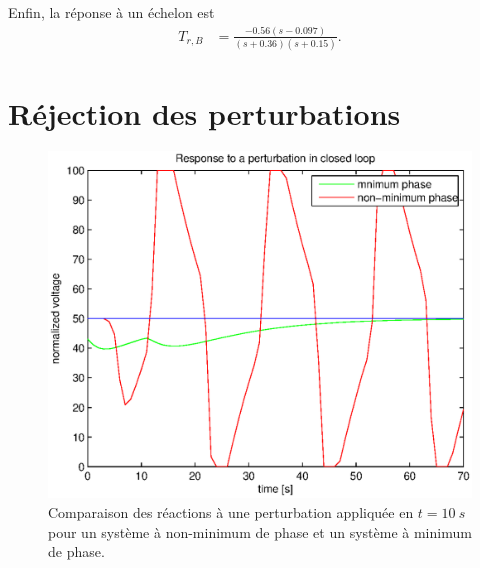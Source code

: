 \documentclass[frenchb, paper=a4, fontsize=11pt]{scrartcl}
\numberwithin{equation}{section}					%
\numberwithin{figure}{section}					%
\numberwithin{table}{section}						%
\begin{document}
Enfin, la réponse à un échelon est
\begin{align*}
T_{r,B} &= \frac{-0.56(s-0.097)}{(s+0.36)(s+0.15)}.
\end{align*}


\section{Réjection des perturbations}

\begin{figure}[ht]
	\centering
	\includegraphics[scale=0.9]{img/pert-rejection-closed-loop.eps}
	\caption{Comparaison des réactions à une perturbation appliquée en
	$t=\SI{10}{s}$ pour un système à non-minimum de phase et un système
	à minimum de phase.}
	\label{fig:settling-time}
\end{figure}
\end{document}
